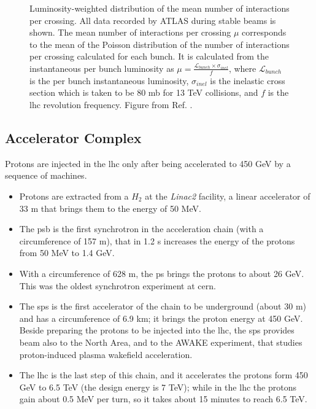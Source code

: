 \begin{figure}[ht]
\centering
{}
\caption{Luminosity-weighted distribution of the mean number of interactions per crossing. All data recorded by ATLAS during stable beams is shown. The mean number of interactions per crossing $\mu$ corresponds to the mean of the Poisson distribution of the number of interactions per crossing calculated for each bunch. It is calculated from the instantaneous per bunch luminosity as 
$\mu = \frac{\mathcal{L}_{bunch}\times \sigma_{inel}}{f}$, where $\mathcal{L}_{bunch}$ is the per bunch instantaneous luminosity, $\sigma_{inel}$ is the inelastic cross section which is taken to be 80 mb for 13 TeV collisions, and $f$ is the \gls{lhc} revolution frequency. Figure from Ref. \cite{LumiTwiki}.}
\label{fig:atlas:pu}
\end{figure}


\subsection{Accelerator Complex}

Protons are injected in the \gls{lhc} only after being accelerated to 450 GeV by a sequence of machines.

\begin{itemize}
\item Protons are extracted from a $H_2$ at the \textit{Linac2} facility, a linear accelerator of 33 m that brings them to the energy of 50 MeV.
\item The \gls{psb} is the first synchrotron in the acceleration chain (with a circumference of 157 m), that in 1.2 s increases the energy of the protons from 50 MeV to 1.4 GeV.
\item With a circumference of 628 m, the \gls{ps} brings the protons to about 26 GeV. This was the oldest synchrotron experiment at \gls{cern}.
\item The \gls{sps} is the first accelerator of the chain to be underground (about 30 m) and has a circumference of 6.9 km; it brings the proton energy at 450 GeV. Beside preparing the protons to be injected into the \gls{lhc}, the \gls{sps} provides beam also to the North Area, and to the AWAKE experiment, that studies proton-induced plasma wakefield acceleration.
\item The \gls{lhc} is the last step of this chain, and it accelerates the protons form 450 GeV to 6.5 TeV (the design energy is 7 TeV); while in the \gls{lhc} the protons gain about 0.5 MeV per turn, so it takes about 15 minutes to reach 6.5 TeV.
\end{itemize}

